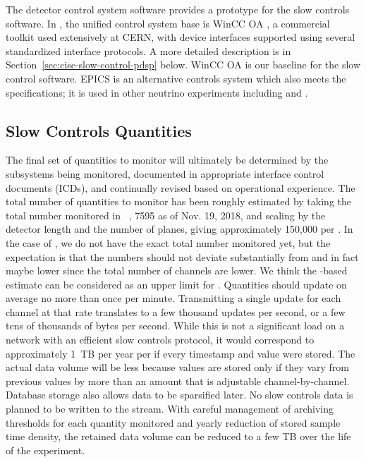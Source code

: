 The  detector control system software \cite{pdspdcs_proc}
provides a prototype for %
the  slow controls software.
In , the unified control system base is WinCC OA \cite{winccoa}, a
commercial toolkit used extensively at CERN, with device interfaces
supported using several standardized interface protocols. A more detailed description is in Section~\ref{sec:cisc-slow-control-pdsp} below.
WinCC OA is our baseline for the  slow control software.
EPICS \cite{epics7} is an alternative controls system which also meets the specifications; it is used in other neutrino experiments including \cite{microboone} and \cite{Lukhanin:2012fp}. 

\subsection{Slow Controls Quantities}
\label{sec:fdgen-slow-cryo-quant}



The final set of quantities to monitor will ultimately be determined
by the subsystems being monitored, documented in appropriate  interface control documents (ICDs), and continually revised based on operational experience.  The total number of quantities to monitor has been roughly estimated by taking the total number monitored in ~\cite{pdspdcs_proc}, 7595 as of Nov. 19, 2018, and scaling by the detector length and the number of planes, giving approximately 150,000 per . In the case of , we do not have the exact total number monitored yet, but the expectation is that the \dual numbers should not deviate substantially from \single and in fact maybe lower since the total number of channels are lower. We think the -based estimate can be considered as an upper limit for \dual.
Quantities should update on average no more than once per minute.
Transmitting a single update for each channel at that rate translates to a few thousand updates per second, or a few tens of thousands of bytes per second. While this is not a significant load on a network with an efficient slow controls protocol, it would correspond to approximately 1~TB per year per  if every timestamp and value were stored.
The actual data volume will be less because values are stored only if they vary from previous values by more than an amount that is adjustable channel-by-channel.
Database storage also allows data to be sparsified later.
No slow controls data is planned to be written to the  stream.
With careful management of archiving thresholds for each quantity monitored and yearly reduction of stored sample time density, the retained data volume can be reduced to a few TB over the life of the experiment.

